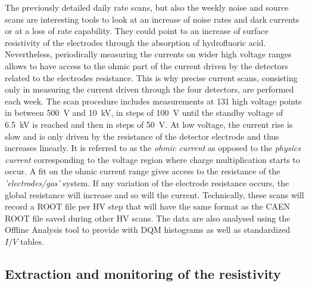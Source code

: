 	The previously detailed daily rate scans, but also the weekly noise and source scans are interesting tools to look at an increase of noise rates and dark currents or at a loss of rate capability. They could point to an increase of surface resistivity of the electrodes through the absorption of hydrofluoric acid. Nevertheless, periodically measuring the currents on wider high voltage ranges allows to have access to the ohmic part of the current driven by the detectors related to the electrodes resistance. This is why precise current scans, consisting only in measuring the current driven through the four detectors, are performed each week. The scan procedure includes measurements at 131 high voltage points in between \SI{500}{V} and \SI{10}{kV}, in steps of \SI{100}{V} until the standby voltage of \SI{6.5}{kV} is reached and then in steps of \SI{50}{V}. At low voltage, the current rise is slow and is only driven by the resistance of the detector electrode and thus increases linearly. It is referred to as the \textit{ohmic current} as opposed to the \textit{physics current} corresponding to the voltage region where charge multiplication starts to occur. A fit on the ohmic current range gives access to the resistance of the \textit{'electrodes/gas'} system. If any variation of the electrode resistance occurs, the global resistance will increase and so will the current. Technically, these scans will record a ROOT file per HV step that will have the same format as the CAEN ROOT file saved during other HV scans. The data are also analysed using the Offline Analysis tool to provide with DQM histograms as well as standardized $I/V$ tables.
	
\endgroup
	
	\subsection{Extraction and monitoring of the resistivity}
	\label{chapt5:ssec:resistivity}
	
\begingroup\setlength{\intextsep}{0pt}\setlength{\columnsep}{15pt}
	
